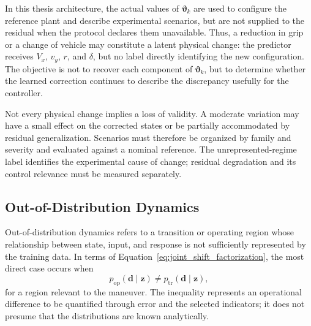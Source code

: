\documentclass[12pt,a4paper]{report}
\begin{document}
In this thesis architecture, the actual values of $\boldsymbol{\vartheta}_k$ are used to configure the reference plant and describe experimental scenarios, but are not supplied to the residual when the protocol declares them unavailable. Thus, a reduction in grip or a change of vehicle may constitute a latent physical change: the predictor receives $V_x$, $v_y$, $r$, and $\delta$, but no label directly identifying the new configuration. The objective is not to recover each component of $\boldsymbol{\vartheta}_k$, but to determine whether the learned correction continues to describe the discrepancy usefully for the controller.

Not every physical change implies a loss of validity. A moderate variation may have a small effect on the corrected states or be partially accommodated by residual generalization. Scenarios must therefore be organized by family and severity and evaluated against a nominal reference. The unrepresented-regime label identifies the experimental cause of change; residual degradation and its control relevance must be measured separately.

\subsection{Out-of-Distribution Dynamics}


Out-of-distribution dynamics refers to a transition or operating region whose relationship between state, input, and response is not sufficiently represented by the training data. In terms of Equation~\eqref{eq:joint_shift_factorization}, the most direct case occurs when
\begin{equation}
    p_{\mathrm{op}}(\mathbf{d}\mid\mathbf{z})
    \neq
    p_{\mathrm{tr}}(\mathbf{d}\mid\mathbf{z}),
    \label{eq:conditional_dynamics_shift}
\end{equation}
for a region relevant to the maneuver. The inequality represents an operational difference to be quantified through error and the selected indicators; it does not presume that the distributions are known analytically.
\end{document}
